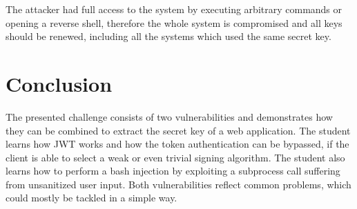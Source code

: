 \documentclass[12pt,a4paper]{article}
\begin{document}
The attacker had full access to the system by executing arbitrary commands or opening a reverse shell, therefore the whole system is compromised and all keys should be renewed, including all the systems which used the same secret key.



\section{Conclusion}
The presented challenge consists of two vulnerabilities and demonstrates how they can be combined to extract the secret key of a web application. The student learns how JWT works and how the token authentication can be bypassed, if the client is able to select a weak or even trivial signing algorithm.
The student also learns how to perform a bash injection by exploiting a subprocess call suffering from unsanitized user input.
Both vulnerabilities reflect common problems, which could mostly be tackled in a simple way.





\end{document}
